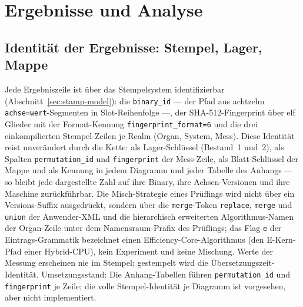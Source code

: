 \section{Ergebnisse und Analyse}\label{sec:eval-results}
\subsection{Identität der Ergebnisse: Stempel, Lager, Mappe}\label{sec:eval-identity}
Jede Ergebniszeile ist über das Stempelsystem identifizierbar (Abschnitt~\ref{sec:stamp-model}): die
\texttt{binary\_id} --- der Pfad aus achtzehn \texttt{achse=wert}-Segmenten in Slot-Reihenfolge ---,
der SHA-512-Fingerprint über elf Glieder mit der Format-Kennung \texttt{fingerprint\_format=6} und die
drei einkompilierten Stempel-Zeilen je Realm (Organ, System, Mess). Diese Identität reist unverändert
durch die Kette: als Lager-Schlüssel (Bestand~1 und~2), als Spalten \texttt{permutation\_id} und
\texttt{fingerprint} der Mess-Zeile, als Blatt-Schlüssel der Mappe und als Kennung in jedem Diagramm
und jeder Tabelle des Anhangs --- so bleibt jede dargestellte Zahl auf ihre Binary, ihre
Achsen-Versionen und ihre Maschine zurückführbar. Die Misch-Strategie eines Prüflings wird nicht über
ein Versions-Suffix ausgedrückt, sondern über die \texttt{merge}-Token \texttt{replace}, \texttt{merge}
und \texttt{union} der Anwender-XML und die hierarchisch erweiterten Algorithmus-Namen der Organ-Zeile
unter dem Namensraum-Präfix des Prüflings; das Flag \texttt{e} der Eintrags-Grammatik bezeichnet einen
Efficiency-Core-Algorithmus (den E-Kern-Pfad einer Hybrid-CPU), kein Experiment und keine Mischung.
Werte der Messung erscheinen nie im Stempel; gestempelt wird die Übersetzungszeit-Identität.
Umsetzungsstand: Die Anhang-Tabellen führen \texttt{permutation\_id} und
\texttt{fingerprint} je Zeile; die volle Stempel-Identität je Diagramm ist vorgesehen, aber nicht implementiert.

